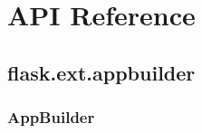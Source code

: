 \documentclass[letterpaper,10pt,english]{sphinxmanual}
\begin{document}
\section{API Reference}
\label{api:api-reference}\label{api::doc}

\subsection{flask.ext.appbuilder}
\label{api:flask-ext-appbuilder}

\subsubsection{AppBuilder}
\label{api:module-flask.ext.appbuilder.base}\label{api:appbuilder}
\end{document}
